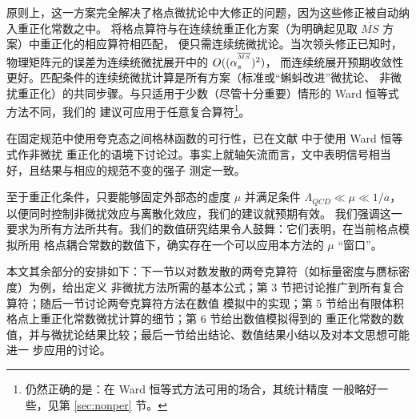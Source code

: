 原则上，这一方案完全解决了格点微扰论中大修正的问题，因为这些修正被自动纳入重正化常数之中。
将格点算符与在连续统重正化方案（为明确起见取 $\overline{MS}$ 方案）中重正化的相应算符相匹配，
便只需连续统微扰论。当次领头修正已知时，物理矩阵元的误差为连续统微扰展开中的 $O((\alpha_s^{{}^{\overline{MS}}})^2)$，
而连续统展开预期收敛性更好。匹配条件的连续统微扰计算是所有方案（标准或``蝌蚪改进''微扰论、
非微扰重正化）的共同步骤。与只适用于少数（尽管十分重要）情形的 Ward 恒等式方法不同，我们的
建议可应用于任意复合算符\footnote{仍然正确的是：在 Ward 恒等式方法可用的场合，其统计精度
一般略好一些，见第 \ref{sec:nonper} 节。}。

在固定规范中使用夸克态之间格林函数的可行性，已在文献 \cite{wi} 中于使用 Ward 恒等式作非微扰
重正化的语境下讨论过。事实上就轴矢流而言，文中表明信号相当好，且结果与相应的规范不变的强子
测定一致。

至于重正化条件，只要能够固定外部态的虚度 $\mu$ 并满足条件
$ \Lambda_{QCD} \ll \mu \ll 1/a $，以便同时控制非微扰效应与离散化效应，我们的建议就预期有效。
我们强调这一要求为所有方法所共有。我们的数值研究结果令人鼓舞：它们表明，在当前格点模拟所用
格点耦合常数的数值下，确实存在一个可以应用本方法的 $\mu$ ``窗口''。

本文其余部分的安排如下：下一节以对数发散的两夸克算符（如标量密度与赝标密度）为例，给出定义
非微扰方法所需的基本公式；第 3 节把讨论推广到所有复合算符；随后一节讨论两夸克算符方法在数值
模拟中的实现；第 5 节给出有限体积格点上重正化常数微扰计算的细节；第 6 节给出数值模拟得到的
重正化常数的数值，并与微扰论结果比较；最后一节给出结论、数值结果小结以及对本文思想可能进一
步应用的讨论。
